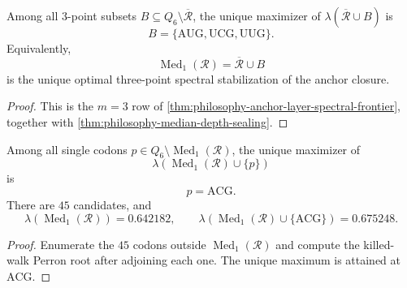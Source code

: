 \begin{theorem}
\label{thm:philosophy-first-median-triple-spectral-optimality}
Among all $3$-point subsets
$B\subseteq Q_{6}\setminus\overline{\mathcal{R}}$, the unique maximizer
of $\lambda(\overline{\mathcal{R}}\cup B)$ is
$$
  B=\{\mathrm{AUG},\mathrm{UCG},\mathrm{UUG}\}.
$$
Equivalently,
$$
  \operatorname{Med}_{1}(\mathcal{R})
  =
  \overline{\mathcal{R}}\cup B
$$
is the unique optimal three-point spectral stabilization of the anchor
closure.
\end{theorem}
\begin{proof}
This is the $m=3$ row of
\autoref{thm:philosophy-anchor-layer-spectral-frontier}, together with
\autoref{thm:philosophy-median-depth-sealing}.
\end{proof}

\begin{theorem}
\label{thm:philosophy-acg-single-point-spectral-optimality}
Among all single codons
$p\in Q_{6}\setminus\operatorname{Med}_{1}(\mathcal{R})$, the unique
maximizer of
$$
  \lambda(\operatorname{Med}_{1}(\mathcal{R})\cup\{p\})
$$
is
$$
  p=\mathrm{ACG}.
$$
There are $45$ candidates, and
$$
  \lambda(\operatorname{Med}_{1}(\mathcal{R}))=0.642182,\qquad
  \lambda(\operatorname{Med}_{1}(\mathcal{R})\cup\{\mathrm{ACG}\})
  =0.675248.
$$
\end{theorem}
\begin{proof}
Enumerate the $45$ codons outside $\operatorname{Med}_{1}(\mathcal{R})$
and compute the killed-walk Perron root after adjoining each one. The
unique maximum is attained at $\mathrm{ACG}$.
\end{proof}

